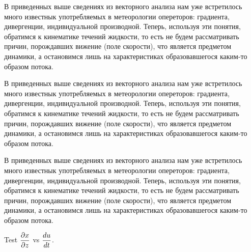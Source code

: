 \begin{boxG}
В приведенных выше сведениях из векторного анализа нам уже встретилось много известнык употребляемых в метеорологии  опереторов: градиента, дивергенции, индивидуальной производной. Теперь, используя эти понятия, обратимся к кинематике течений жидкости, то есть не будем рассматривать причин, порождавших вижение (поле скорости), что является предметом динамики, а остановимся лишь на характеристиках образовавшегося каким-то образом потока.
\end{boxG}

\begin{boxH}
В приведенных выше сведениях из векторного анализа нам уже встретилось много известнык употребляемых в метеорологии  опереторов: градиента, дивергенции, индивидуальной производной. Теперь, используя эти понятия, обратимся к кинематике течений жидкости, то есть не будем рассматривать причин, порождавших вижение (поле скорости), что является предметом динамики, а остановимся лишь на характеристиках образовавшегося каким-то образом потока.
\end{boxH}

\begin{boxI}
В приведенных выше сведениях из векторного анализа нам уже встретилось много известнык употребляемых в метеорологии  опереторов: градиента, дивергенции, индивидуальной производной. Теперь, используя эти понятия, обратимся к кинематике течений жидкости, то есть не будем рассматривать причин, порождавших вижение (поле скорости), что является предметом динамики, а остановимся лишь на характеристиках образовавшегося каким-то образом потока.
\end{boxI}

Test $\displaystyle\frac{\partial x}{\partial z}$ vs $\displaystyle\frac{d u}{d t}$.